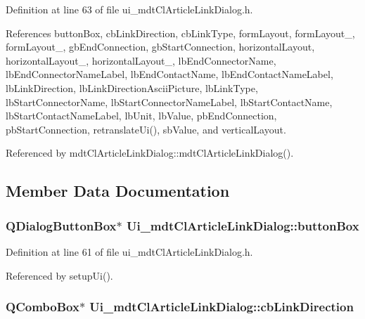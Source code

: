 Definition at line 63 of file ui\-\_\-mdt\-Cl\-Article\-Link\-Dialog.\-h.



References button\-Box, cb\-Link\-Direction, cb\-Link\-Type, form\-Layout, form\-Layout\-\_, form\-Layout\-\_, gb\-End\-Connection, gb\-Start\-Connection, horizontal\-Layout, horizontal\-Layout\-\_, horizontal\-Layout\-\_, lb\-End\-Connector\-Name, lb\-End\-Connector\-Name\-Label, lb\-End\-Contact\-Name, lb\-End\-Contact\-Name\-Label, lb\-Link\-Direction, lb\-Link\-Direction\-Ascii\-Picture, lb\-Link\-Type, lb\-Start\-Connector\-Name, lb\-Start\-Connector\-Name\-Label, lb\-Start\-Contact\-Name, lb\-Start\-Contact\-Name\-Label, lb\-Unit, lb\-Value, pb\-End\-Connection, pb\-Start\-Connection, retranslate\-Ui(), sb\-Value, and vertical\-Layout.



Referenced by mdt\-Cl\-Article\-Link\-Dialog\-::mdt\-Cl\-Article\-Link\-Dialog().



\subsection{Member Data Documentation}
\hypertarget{class_ui__mdt_cl_article_link_dialog_a94e5a7edf091df56fba4eb32712223db}{
\subsubsection[{button\-Box}]{\setlength{\rightskip}{0pt plus 5cm}Q\-Dialog\-Button\-Box$\ast$ Ui\-\_\-mdt\-Cl\-Article\-Link\-Dialog\-::button\-Box}}\label{class_ui__mdt_cl_article_link_dialog_a94e5a7edf091df56fba4eb32712223db}


Definition at line 61 of file ui\-\_\-mdt\-Cl\-Article\-Link\-Dialog.\-h.



Referenced by setup\-Ui().

\hypertarget{class_ui__mdt_cl_article_link_dialog_a68d436550895e816263e5fa070701247}{
\subsubsection[{cb\-Link\-Direction}]{\setlength{\rightskip}{0pt plus 5cm}Q\-Combo\-Box$\ast$ Ui\-\_\-mdt\-Cl\-Article\-Link\-Dialog\-::cb\-Link\-Direction}}\label{class_ui__mdt_cl_article_link_dialog_a68d436550895e816263e5fa070701247}


